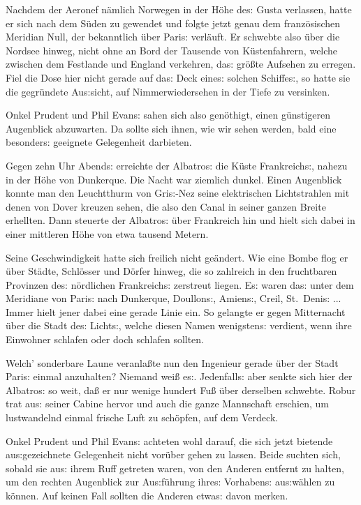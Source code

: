 \documentclass[oneside,12pt]{book}
\newcommand{\s}{s:}
\begin{document}
Nachdem der Aeronef n\"amlich Norwegen in der H\"ohe de{\s} Gusta
verlassen, hatte er sich nach dem S\"uden zu gewendet und folgte
jetzt genau dem franz\"osischen Meridian Null, der bekanntlich \"uber
Pari{\s} verl\"auft. Er schwebte also \"uber die Nordsee hinweg,
nicht ohne an Bord der Tausende von K\"ustenfahrern, welche zwischen
dem Festlande und England verkehren, da{\s} gr\"o{\ss}te Aufsehen zu
erregen. Fiel die Dose hier nicht gerade auf da{\s} Deck eine{\s}
solchen Schiffe{\s}, so hatte sie die gegr\"undete Au{\s}sicht, auf
Nimmerwiedersehen in der Tiefe zu versinken.

Onkel Prudent und Phil Evan{\s} sahen sich also gen\"othigt, einen
g\"unstigeren Augenblick abzuwarten. Da sollte sich ihnen, wie wir
sehen werden, bald eine besonder{\s} geeignete Gelegenheit darbieten.

Gegen zehn Uhr Abend{\s} erreichte der {\glqq}Albatro{\s}{\grqq} die
K\"uste Frankreich{\s}, nahezu in der H\"ohe von Dunkerque. Die Nacht
war ziemlich dunkel. Einen Augenblick konnte man den Leuchtthurm von
Gri{\s}-Nez seine elektrischen Lichtstrahlen mit denen von Dover
kreuzen sehen, die also den Canal in seiner ganzen Breite erhellten.
Dann steuerte der {\glqq}Albatro{\s}{\grqq} \"uber Frankreich hin und
hielt sich dabei in einer mittleren H\"ohe von etwa tausend Metern.

Seine Geschwindigkeit hatte sich freilich nicht ge\"andert. Wie eine
Bombe flog er \"uber St\"adte, Schl\"osser und D\"orfer hinweg, die
so zahlreich in den fruchtbaren Provinzen de{\s} n\"ordlichen
Frankreich{\s} zerstreut liegen. E{\s} waren da{\s} unter dem
Meridiane von Pari{\s} nach Dunkerque, Doullon{\s}, Amien{\s}, Creil,
St.~Deni{\s} ... Immer hielt jener dabei eine gerade Linie ein. So
gelangte er gegen Mitternacht \"uber die {\glqq}Stadt de{\s}
Licht{\s}{\grqq}, welche diesen Namen wenigsten{\s} verdient, wenn
ihre Einwohner schlafen oder doch schlafen sollten.

Welch' sonderbare Laune veranla{\ss}te nun den Ingenieur gerade
\"uber der Stadt Pari{\s} einmal anzuhalten? Niemand wei{\ss} e{\s}.
Jedenfall{\s} aber senkte sich hier der {\glqq}Albatro{\s}{\grqq} so
weit, da{\ss} er nur wenige hundert Fu{\ss} \"uber derselben
schwebte. Robur trat au{\s} seiner Cabine hervor und auch die ganze
Mannschaft erschien, um lustwandelnd einmal frische Luft zu
sch\"opfen, auf dem Verdeck.

Onkel Prudent und Phil Evan{\s} achteten wohl darauf, die sich jetzt
bietende au{\s}gezeichnete Gelegenheit nicht vor\"uber gehen zu
lassen. Beide suchten sich, sobald sie au{\s} ihrem Ruff getreten
waren, von den Anderen entfernt zu halten, um den rechten Augenblick
zur Au{\s}f\"uhrung ihre{\s} Vorhaben{\s} au{\s}w\"ahlen zu k\"onnen.
Auf keinen Fall sollten die Anderen etwa{\s} davon merken.
\end{document}
